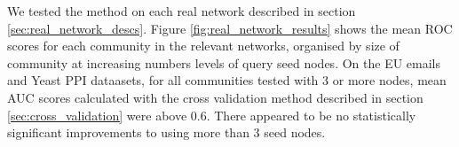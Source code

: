 \documentclass[sigconf]{acmart}
\begin{document}
% 
% 


We tested the method on each real network described in section \ref{sec:real_network_descs}.
Figure \ref{fig:real_network_results} shows the mean ROC scores for each community in the relevant networks, organised by size of community at increasing numbers levels of query seed nodes.
On the EU emails and Yeast PPI dataasets, for all communities tested with 3 or more nodes, mean AUC scores calculated with the cross validation method described in section \ref{sec:cross_validation} were above 0.6.
There appeared to be no statistically significant improvements to using more than 3 seed nodes.
\end{document}
